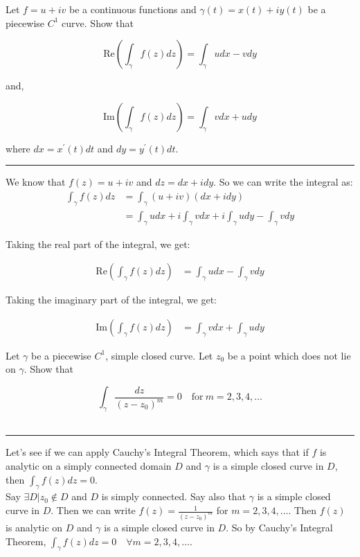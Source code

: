 \begin{example}

    Let $f=u+iv$ be a continuous functions and $\gamma(t)=x(t)+iy(t)$ be a piecewise $C^1$ curve. Show that

    $$\mathrm{Re}\left(\int_\gamma f(z)dz\right)=\int_\gamma udx-vdy$$

    and,

    $$\mathrm{Im}\left(\int_\gamma f(z)dz\right)=\int_\gamma vdx+udy$$

    where $dx=x^{\prime}(t)dt$ and $dy=y^{\prime}(t)dt$.\\

    \hrule
    \vspace{0.5cm}
    We know that $f(z) = u+iv$ and $dz = dx + idy$. So we can write the integral as:
    \begin{align*}
        \int_\gamma f(z)dz & = \int_\gamma (u+iv)(dx+idy)                                              \\
                           & = \int_\gamma udx + i\int_\gamma vdx + i\int_\gamma udy - \int_\gamma vdy
    \end{align*}

    Taking the real part of the integral, we get:

    \begin{align*}
        \mathrm{Re}\left(\int_\gamma f(z)dz\right) & = \int_\gamma udx - \int_\gamma vdy
    \end{align*}

    Taking the imaginary part of the integral, we get:

    \begin{align*}
        \mathrm{Im}\left(\int_\gamma f(z)dz\right) & = \int_\gamma vdx + \int_\gamma udy
    \end{align*}
\end{example}

\begin{example}

    Let $\gamma$ be a piecewise $C^1$, simple closed curve. Let $z_0$ be a point which does not lie on $\gamma.$ Show that

    $$\int_\gamma\frac{dz}{(z-z_0)^m}=0\quad\mathrm{for~}m=2,3,4,\ldots $$\\

    \hrule
    \vspace{0.5cm}


    Let's see if we can apply Cauchy's Integral Theorem, which says that if $f$ is analytic on a simply connected domain $D$ and $\gamma$ is a simple closed curve in $D$, then $\int_\gamma f(z)dz = 0$. \\
    Say $\exists D | z_0 \notin D$ and $D$ is simply connected. Say also that $\gamma$ is a simple closed curve in $D$. Then we can write $f(z) = \frac{1}{(z-z_0)^m}$ for $m=2,3,4,\ldots$. Then $f(z)$ is analytic on $D$ and $\gamma$ is a simple closed curve in $D$. So by Cauchy's Integral Theorem, $\int_\gamma f(z)dz = 0 \quad \forall m=2,3,4,\ldots$.
\end{example}

